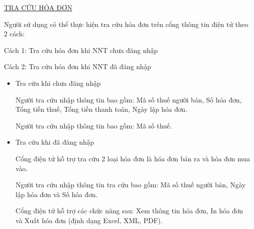 \item \underline{TRA CỨU HÓA ĐƠN}

Người sử dụng có thể thực hiện tra cứu hóa đơn trên cổng thông tin điện tử theo 2 cách:

Cách 1: Tra cứu hóa đơn khi NNT chưa đăng nhập

Cách 2: Tra cứu hóa đơn khi NNT đã đăng nhập

\begin{itemize}

\item Tra cứu khi chưa đăng nhập


Người tra cứu nhập thông tin bao gồm: Mã số thuế người bán, Số hóa đơn, Tổng tiền thuế, Tổng tiền thanh toán, Ngày lập hóa đơn.






Người tra cứu nhập thông tin bao gồm: Mã số thuế.




\item Tra cứu khi đã đăng nhập

Cổng điện tử hỗ trợ tra cứu 2 loại hóa đơn là hóa đơn bán ra và hóa đơn mua vào.

Người tra cứu nhập thông tin tra cứu bao gồm: Mã số thuế người bán, Ngày lập hóa đơn và Số hóa đơn.

Cổng điện tử hỗ trợ các chức năng sau: Xem thông tin hóa đơn, In hóa đơn và Xuất hóa đơn (định dạng Excel, XML, PDF).

\end{itemize}


